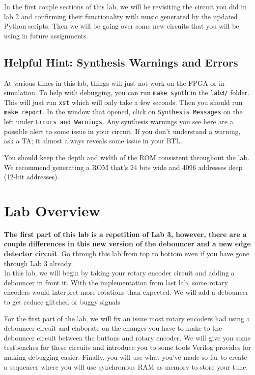 \documentclass[11pt]{article}
\begin{document}
In the first couple sections of this lab, we will be revisiting the circuit you did in lab 2 and confirming their functionality with music generated by the updated Python scripts. Then we will be going over some new circuits that you will be using in future assignments.

\subsection{Helpful Hint: Synthesis Warnings and Errors}
At various times in this lab, things will just not work on the FPGA or in simulation. To help with debugging, you can run \verb|make synth| in the \verb|lab3/| folder. This will just run \verb|xst| which will only take a few seconds. Then you should run \verb|make report|. In the window that opened, click on \verb|Synthesis Messages| on the left under \verb|Errors and Warnings|. Any synthesis warnings you see here are a possible alert to some issue in your circuit. If you don't understand a warning, ask a TA; it almost always reveals some issue in your RTL.

You should keep the depth and width of the ROM consistent throughout the lab. We recommend generating a ROM that's 24 bits wide and 4096 addresses deep (12-bit addresses).
\section{Lab Overview}

\textbf{The first part of this lab is a repetition of Lab 3, however, there are a couple differences in this new version of the debouncer and a new edge detector circuit}. Go through this lab from top to bottom even if you have gone through Lab 3 already.\\

In this lab, we will begin by taking your rotary encoder circuit and adding a debouncer in front it. With the implementation from last lab, some rotary encoders would interpret more rotations than expected. We will add a debouncer to get reduce glitched or buggy signals

For the first part of the lab, we will fix an issue most rotary encoders had using a debouncer circuit and elaborate on the changes you have to make to the debouncer circuit between the buttons and rotary encoder. We will give you some testbenches for these circuits and introduce you to some tools Verilog provides for making debugging easier. Finally, you will use what you've made so far to create a sequencer where you will use synchronous RAM as memory to store your tune.
\end{document}
